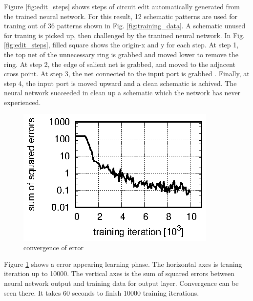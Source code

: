 \documentclass[twocolumn]{article}
\begin{document}
Figure \ref{fig:edit_steps} shows steps of circuit edit
automatically generated from the trained neural network.
For this result, 12 schematic patterns are used for traning
out of 36 patterns shown in Fig. \ref{fig:training_data}.
A schematic unused for traning is picked up,
then challenged by the tranined neural network.
In Fig. \ref{fig:edit_steps}, filled square shows the origin-x and y
for each step.
At step 1, the top net of the unnecessary ring is grabbed and moved lower
to remove the ring.
At step 2, the edge of salient net is grabbed,
and moved to the adjacent cross point.
At step 3, the net connected to the input port is grabbed .
Finally, at step 4, the input port is moved upward
and a clean schematic is achived.
The neural network succeeded in clean up a schematic
which the network has never experienced.

\begin{figure}[!tp]
 \begin{center}
  \begin{minipage}{\hsize}
   \includegraphics[width=\hsize]{fig/errors.eps}
   \caption{convergence of error}
   \label{fig:errors}
  \end{minipage}
 \end{center}
\end{figure}

Figure \ref{fig:errors} shows a error appearing learning phase.
The horizontal axes is traning iteration up to 10000.
The vertical axes is the sum of squared errors between
neural network output and training data for output layer.
Convergence can be seen there.
It takes 60 seconds to finish 10000 training iterations.
\end{document}
